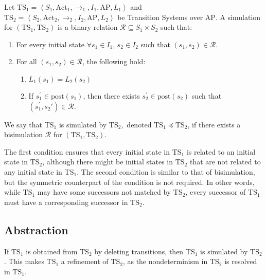 \begin{definition}
    Let $\text{TS}_1=\left\langle S_1,\text{Act}_1,\rightarrow_1,I_1,\text{AP},L_1\right\rangle$ and \\ $\text{TS}_2=\left\langle S_2,\text{Act}_2,\rightarrow_2,I_2,\text{AP},L_2\right\rangle$ be Transition Systems over $\text{AP}$. 
    A simulation for $(\text{TS}_1,\text{TS}_2)$ is a binary relation $\mathcal{R}\subseteq S_1\times S_2$ such that: 
    \begin{enumerate}
        \item For every initial state $\forall s_1\in I_1$, $s_2\in I_2$ such that $(s_1,s_2)\in \mathcal{R}$. 
        \item For all $(s_1,s_2)\in \mathcal{R}$, the following hold:
            \begin{enumerate}
                \item $L_1(s_1)=L_2(s_2)$
                \item If $s_1^\prime\in\text{post}(s_1)$, then there exists $s_2^\prime\in\text{post}(s_2)$ such that $(s_1^\prime,s_2\prime)\in\mathcal{R}$. 
            \end{enumerate}
    \end{enumerate}
    We say that $\text{TS}_1$ is simulated by $\text{TS}_2,$ denoted $\text{TS}_1 \preceq \text{TS}_2$, if there exists a bisimulation $\mathcal{R}$ for $(\text{TS}_1,\text{TS}_2)$. 
\end{definition}
\noindent The first condition ensures that every initial state in $\text{TS}_1$ is related to an initial state in $\text{TS}_2$, although there might be initial states in $\text{TS}_2$ that are not related to any initial state in $\text{TS}_1$. 
The second condition is similar to that of bisimulation, but the symmetric counterpart of the condition is not required.
In other words, while $\text{TS}_1$ may have some successors not matched by $\text{TS}_2$, every successor of $\text{TS}_1$ must have a corresponding successor in $\text{TS}_2$.






\subsection{Abstraction}
\begin{definition}
    If $\text{TS}_1$ is obtained from $\text{TS}_2$ by deleting transitions, then $\text{TS}_1$ is simulated by $\text{TS}_2$. 
    This makes $\text{TS}_1$ a refinement of $\text{TS}_2$, as the nondeterminism in $\text{TS}_2$ is resolved in $\text{TS}_1$.
\end{definition}


